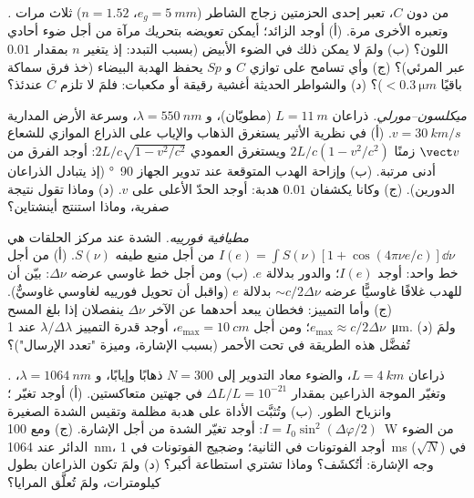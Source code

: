 \begin{exercise}[$\star\star$]\label{exo:b2:michelson:8}
\emph{.} من دون $C$، تعبر إحدى الحزمتين زجاج
الشاطر ($e_g = \qty{5}{mm}$، $n = 1.52$) ثلاث مرات وتعبره الأخرى مرة. (أ)
أوجد  الزائد؛ أيمكن تعويضه بتحريك مرآة من أجل
ضوء أحادي اللون؟ (ب) ولمَ لا يمكن ذلك في الضوء الأبيض (بسبب التبدد: إذ يتغير $n$
بمقدار $0.01$ عبر المرئي)؟ (ج) وأي تسامح على
توازي $C$ و $Sp$ يحفظ الهدبة البيضاء (خذ فرق سماكة
باقيًا $< \qty{0.3}{\micro m}$)؟ (د) والشواطر الحديثة
أغشية رقيقة أو مكعبات: فلمَ لا تلزم $C$ عندئذ؟
\end{exercise}

\begin{exercise}[$\star\star$]\label{exo:b2:michelson:9}
\emph{ميكلسون--مورلي.} ذراعان $L = \qty{11}{m}$ (مطويّان)، و $\lambda = \qty{550}{nm}$،
وسرعة الأرض المدارية $v = \qty{30}{km/s}$. (أ) في نظرية الأثير يستغرق
الذهاب والإياب على الذراع الموازي للشعاع $\vect v$ زمنًا $2L/c(1 - v^2/c^2)$
ويستغرق العمودي $2L/c\sqrt{1 - v^2/c^2}$: أوجد الفرق من أدنى
مرتبة. (ب) وإزاحة الهدب المتوقعة عند تدوير الجهاز \qty{90}{\degree}
(إذ يتبادل الذراعان الدورين). (ج) وكانا يكشفان $0.01$ هدبة: أوجد الحدّ
الأعلى على $v$. (د) وماذا تقول نتيجة صفرية، وماذا استنتج أينشتاين؟
\end{exercise}

\begin{exercise}[$\star\star\star$]\label{exo:b2:michelson:10}
\emph{مطيافية فورييه.} الشدة عند مركز الحلقات
هي $I(e) = \int S(\nu)[1 + \cos(4\pi\nu e/c)]\dd\nu$ من أجل منبع طيفه
$S(\nu)$. (أ) من أجل خط واحد: أوجد $I(e)$؛ والدور بدلالة $e$. (ب) ومن أجل خط
غاوسي عرضه $\Delta\nu$: بيّن أن للهدب غلافًا غاوسيًّا عرضه
$\sim c/2\Delta\nu$ بدلالة $e$ (واقبل أن تحويل فورييه لغاوسي
غاوسيٌّ). (ج) وأما التمييز: فخطان يبعد أحدهما عن الآخر $\Delta\nu$ ينفصلان إذا
بلغ المسح $e_{\max} \approx c/2\Delta\nu$؛ ومن أجل $e_{\max} = \qty{10}{cm}$، أوجد
قدرة التمييز $\lambda/\Delta\lambda$ عند \qty{1}{\micro m}. (د) ولمَ تُفضَّل هذه الطريقة
في تحت الأحمر (بسبب الإشارة، وميزة "تعدد الإرسال")؟
\end{exercise}

\begin{exercise}[$\star\star\star$]\label{exo:b2:michelson:11}
\emph{.} ذراعان $L = \qty{4}{km}$، والضوء معاد التدوير
إلى $N = 300$ ذهابًا وإيابًا، و $\lambda = \qty{1064}{nm}$، وتغيّر الموجة الذراعين بمقدار
$\Delta L/L = 10^{-21}$ في جهتين متعاكستين. (أ) أوجد تغيّر ؛
وانزياح الطور. (ب) وتُثبَّت الأداة على هدبة مظلمة وتقيس
الشدة الصغيرة $I = I_0\sin^2(\Delta\varphi/2)$: أوجد تغيّر الشدة من أجل
الإشارة. (ج) ومع \qty{100}{W} من الضوء الدائر عند \qty{1064}{nm}، أوجد الفوتونات
في الثانية؛ وضجيج الفوتونات في \qty{1}{ms} ($\sqrt N$) في وجه الإشارة:
أتُكشَف؟ وماذا تشتري استطاعة أكبر؟ (د) ولمَ تكون الذراعان
بطول كيلومترات، ولمَ تُعلَّق المرايا؟
\end{exercise}

